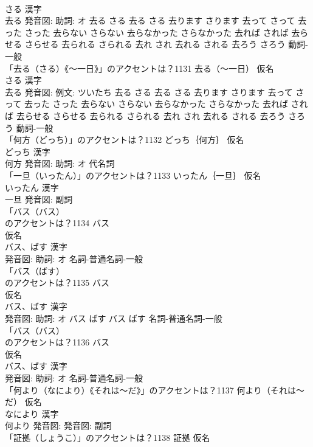 \documentclass[8pt]{extreport}
\begin{document}
\begin{CJK}{UTF8}{min}
\\	さる 漢字　
\\	去る 発音図: 助詞: オ	去る さる		去る さる 去ります さります 去って さって 去った さった 去らない さらない 去らなかった さらなかった 去れば されば 去らせる さらせる 去られる さられる 去れ され 去れる される 去ろう さろう				動詞-一般 
\\	「去る（さる）《〜一日》」のアクセントは？1131	去る（〜一日） 仮名　
\\	さる 漢字　
\\	去る 発音図: 例文: ツいたち	去る さる		去る さる 去ります さります 去って さって 去った さった 去らない さらない 去らなかった さらなかった 去れば されば 去らせる さらせる 去られる さられる 去れ され 去れる される 去ろう さろう				動詞-一般 
\\	「何方（どっち）」のアクセントは？1132	どっち｛何方｝ 仮名　
\\	どっち 漢字　
\\	何方 発音図: 助詞: オ							代名詞 
\\	「一旦（いったん）」のアクセントは？1133	いったん｛一旦｝ 仮名　
\\	いったん 漢字　
\\	一旦 発音図:							副詞 
\\	「バス（バス）
\\	のアクセントは？1134	バス
\\	仮名　
\\	バス、ばす 漢字　
\\	発音図: 助詞: オ							名詞-普通名詞-一般 
\\	「バス（ばす）
\\	のアクセントは？1135	バス
\\	仮名　
\\	バス、ばす 漢字　
\\	発音図: 助詞: オ	バス ばす		バス ばす				名詞-普通名詞-一般 
\\	「バス（バス）
\\	のアクセントは？1136	バス
\\	仮名　
\\	バス、ばす 漢字　
\\	発音図: 助詞: オ							名詞-普通名詞-一般 
\\	「何より（なにより）《それは〜だ》」のアクセントは？1137	何より（それは〜だ） 仮名　
\\	なにより 漢字　
\\	何より 発音図: 発音図:							副詞 
\\	「証拠（しょうこ）」のアクセントは？1138	証拠 仮名　

\end{CJK}
\end{document}
